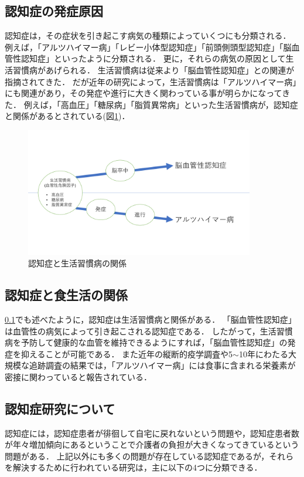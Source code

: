 \documentclass[../report]{subfiles}
\begin{document}
\subsection{認知症の発症原因} \label{sec:cause}
認知症は，その症状を引き起こす病気の種類によっていくつにも分類される．
例えば，「アルツハイマー病」「レビー小体型認知症」「前頭側頭型認知症」「脳血管性認知症」といったように分類される．
更に，それらの病気の原因として生活習慣病があげられる．
生活習慣病は従来より「脳血管性認知症」との関連が指摘されてきた．
だが近年の研究によって，生活習慣病は「アルツハイマー病」にも関連があり，その発症や進行に大きく関わっている事が明らかになってきた\cite{seikatsu}．
例えば，「高血圧」「糖尿病」「脂質異常病」といった生活習慣病が，認知症と関係があるとされている(図\ref{fig:relation-dementia-life-habit})．
\begin{figure}[htbp]
    \begin{center}
        \includegraphics[width=10cm]{imgs/1_relation-dementia-life-habit.pdf}
        \caption{認知症と生活習慣病の関係}
        \label{fig:relation-dementia-life-habit}
    \end{center}
\end{figure}


\subsection{認知症と食生活の関係} \label{sec:relation-dementia-dietary-habit}
\ref{sec:cause}でも述べたように，認知症は生活習慣病と関係がある．
「脳血管性認知症」は血管性の病気によって引き起こされる認知症である．
したがって，生活習慣病を予防して健康的な血管を維持できるようにすれば，「脳血管性認知症」の発症を抑えることが可能である．
また近年の縦断的疫学調査や5$\sim$10年にわたる大規模な追跡調査の結果では，「アルツハイマー病」には食事に含まれる栄養素が密接に関わっていると報告されている\cite{nutrition-dementia-00}\cite{nutrition-dementia-01}．


\subsection{認知症研究について}
認知症には，認知症患者が徘徊して自宅に戻れないという問題や，認知症患者数が年々増加傾向にあるということで介護者の負担が大きくなってきているという問題がある．
上記以外にも多くの問題が存在している認知症であるが，それらを解決するために行われている研究は，主に以下の4つに分類できる．
\end{document}
